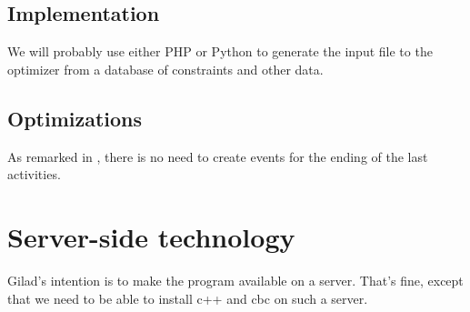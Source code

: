 \documentclass[11pt,reqno]{amsart}
\numberwithin{equation}{section}
\begin{document}
\subsection{Implementation}

We will probably use either PHP or Python to generate the input file to the optimizer from
a database of constraints and other data.

\subsection{Optimizations}
As remarked in \cite{artigues-etal11}, there is no need to create
events for the ending of the last activities. 

\section{Server-side technology}

Gilad's intention is to make the program available on a server. That's
fine, except that we need to be able to install c++ and cbc on such a server.



\end{document}
